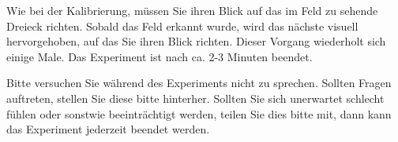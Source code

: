 \documentclass[a4paper,10pt,oneside,headsepline]{scrartcl}
\begin{document}
Wie bei der Kalibrierung, müssen Sie ihren Blick auf das im Feld zu sehende Dreieck richten. Sobald das Feld erkannt wurde, wird das nächste visuell hervorgehoben, auf das Sie ihren Blick richten. Dieser Vorgang wiederholt sich einige Male. Das Experiment ist nach ca. 2-3 Minuten beendet.

Bitte versuchen Sie während des Experiments nicht zu sprechen. Sollten Fragen auftreten, stellen Sie diese bitte hinterher. Sollten Sie sich unerwartet schlecht fühlen oder sonstwie beeinträchtigt werden, teilen Sie dies bitte mit, dann kann das Experiment jederzeit beendet werden.
\end{document}
